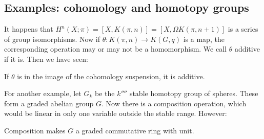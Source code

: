\documentclass[11pt]{article}
\begin{document}
\subsection{Examples: cohomology and homotopy groups}
It happens that $H^n(X;\pi)=[X,K(\pi,n)]=[X,\Omega K(\pi,n+1)]$ is a series of
group isomorphisms. Now if $\theta:K(\pi,n)\to K(G,q)$ is a map, the
corresponding operation may or may not be a homomorphism. We call $\theta$
additive if it is. Then we have seen:
\begin{prop*}
If $\theta$ is in the image of the cohomology suspension, it is additive.
\end{prop*}
For another example, let $G_k$ be the $k\fourth$ stable homotopy group of
spheres. These form a graded abelian group $G$. Now there is a composition
operation, which would be linear in only one variable outside the stable range.
However:
\begin{thm*}
Composition makes $G$ a graded commutative ring with unit.
\end{thm*}
\end{document}
